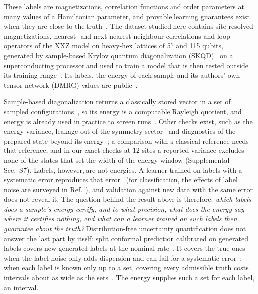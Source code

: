 \documentclass[aps,prx,twocolumn,10pt,superscriptaddress,nofootinbib,longbibliography,floatfix]{revtex4-2}
\theoremstyle{remark}
\begin{document}
These labels are magnetizations, correlation functions and order parameters at many values of a Hamiltonian
parameter, and provable learning guarantees exist when they are close to the
truth~\cite{huang2022,lewis2024,wanner2024}. The dataset studied here contains site-resolved
magnetizations, nearest- and next-nearest-neighbour correlations and loop operators of the XXZ model on heavy-hex
lattices of 57 and 115 qubits, generated by sample-based Krylov quantum diagonalization (SKQD)~\cite{yu2025skqd} on a %
superconducting processor and used to train a model that is then tested outside its training
range~\cite{jaderberg2026}. Its labels, the energy of each sample and its authors' own tensor-network (DMRG) values
are public~\cite{jaderberg2026data}.

Sample-based diagonalization returns a classically stored vector in a set of sampled configurations~\cite{kanno2023,robledo2025,yu2025skqd}, so its energy is
a computable Rayleigh quotient, and energy is already used in practice to screen runs~\cite{jaderberg2026}. Other
checks exist, such as the energy variance, leakage out of the symmetry sector~\cite{chen2026} and diagnostics of the
prepared state beyond its energy~\cite{niu2026}; a comparison with a classical reference needs that reference, and in
our exact checks at $12$ sites a reported variance excludes none of the states that set the width of the energy %
window (Supplemental Sec.~S7). Labels, however, are not energies. A learner trained on labels with a systematic error reproduces that
error~\cite{koridon2024} (for classification, the effects of label noise are surveyed in Ref.~\cite{frenay2014}), and
validation against new data with the same error does not reveal it. The question behind the result above is therefore: \emph{which labels does a sample's energy certify, and to what precision, what
does the energy say where it certifies nothing, and what can a learner trained on such labels then guarantee about the
truth?} Distribution-free uncertainty
quantification does not answer the last part by itself: split conformal prediction calibrated on generated labels
covers new generated labels at the nominal rate~\cite{angelopoulos2021}. It covers the true ones when the label noise
only adds dispersion and can fail for a systematic error~\cite{einbinder2022}; when each label is known only up to a
set, covering every admissible truth costs intervals about as wide as the sets~\cite{cauchois2022}. The energy
supplies such a set for each label, an interval.
\end{document}
